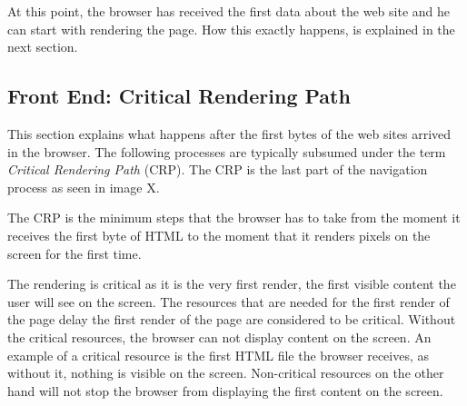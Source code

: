 
At this point, the browser has received the first data about the web site and he can start with rendering the page.
How this exactly happens, is explained in the next section.







\subsection{Front End: Critical Rendering Path}

This section explains what happens after the first bytes of the web sites arrived in the browser.
The following processes are typically subsumed under the term \textit{Critical Rendering Path} (CRP).
The CRP is the last part of the navigation process as seen in image X.



The CRP is the minimum steps that the browser has to take from the moment it receives the first byte of HTML to the moment that it renders pixels on the screen for the first time.

The rendering is critical as it is the very first render, the first visible content the user will see on the screen.
The resources that are needed for the first render of the page delay the first render of the page are considered to be critical.
Without the critical resources, the browser can not display content on the screen.
An example of a critical resource is the first HTML file the browser receives, as without it, nothing is visible on the screen.
Non-critical resources on the other hand will not stop the browser from displaying the first content on the screen. %







